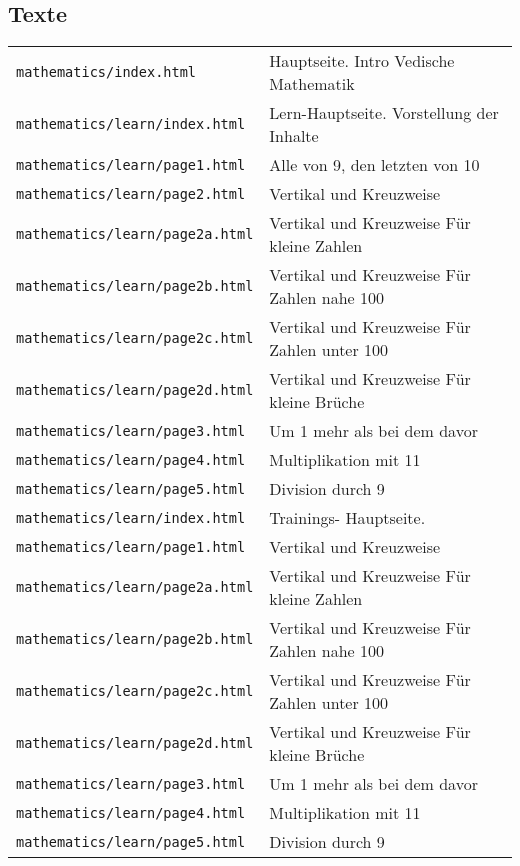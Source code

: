 \subsection{Texte}
\begin{tabular}{ | p{} | p{} | } 
	\texttt{mathematics/index.html}	& Hauptseite. Intro Vedische Mathematik\\
	\texttt{mathematics/learn/index.html}	& Lern-Hauptseite. Vorstellung der Inhalte\\
	\texttt{mathematics/learn/page1.html}	& Alle von 9, den letzten von 10\\
	\texttt{mathematics/learn/page2.html}	& Vertikal und Kreuzweise\\
	\texttt{mathematics/learn/page2a.html}	& Vertikal und Kreuzweise Für kleine Zahlen\\
	\texttt{mathematics/learn/page2b.html}	& Vertikal und Kreuzweise Für Zahlen nahe 100\\
	\texttt{mathematics/learn/page2c.html}	& Vertikal und Kreuzweise Für Zahlen unter 100\\
	\texttt{mathematics/learn/page2d.html}	& Vertikal und Kreuzweise Für kleine Brüche\\
	\texttt{mathematics/learn/page3.html}	& Um 1 mehr als bei dem davor\\
	\texttt{mathematics/learn/page4.html}	& Multiplikation mit 11\\
	\texttt{mathematics/learn/page5.html}	& Division durch 9\\
	\texttt{mathematics/learn/index.html}	& Trainings- Hauptseite.\\
	\texttt{mathematics/learn/page1.html}	& Vertikal und Kreuzweise\\
	\texttt{mathematics/learn/page2a.html}	& Vertikal und Kreuzweise Für kleine Zahlen\\
	\texttt{mathematics/learn/page2b.html}	& Vertikal und Kreuzweise Für Zahlen nahe 100\\
	\texttt{mathematics/learn/page2c.html}	& Vertikal und Kreuzweise Für Zahlen unter 100\\
	\texttt{mathematics/learn/page2d.html}	& Vertikal und Kreuzweise Für kleine Brüche\\
	\texttt{mathematics/learn/page3.html}	& Um 1 mehr als bei dem davor\\
	\texttt{mathematics/learn/page4.html}	& Multiplikation mit 11\\
	\texttt{mathematics/learn/page5.html}	& Division durch 9\\
\end{tabular}




